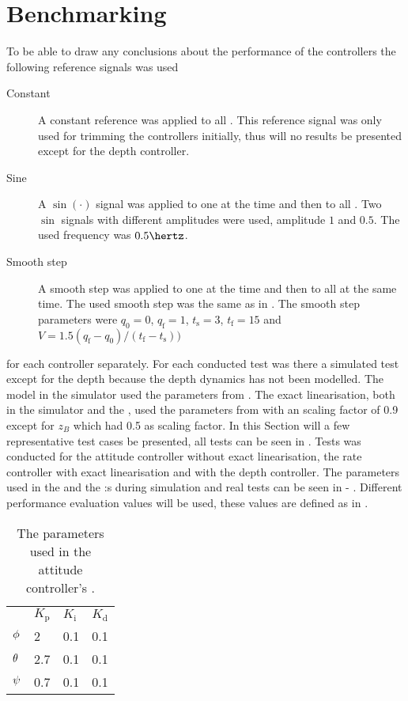 \section{Benchmarking}
To be able to draw any conclusions about the performance of the controllers the following reference signals was used
\begin{description}
\item[Constant] A constant reference was applied to all \abbrDOF. This reference signal was only used for trimming the controllers initially, thus will no results be presented except for the depth controller.

\item[Sine] A $\sin(\cdot)$ signal was applied to one \abbrDOF at the time and then to all \abbrDOF. Two $\sin$ signals with different amplitudes were used, amplitude $1$ and $0.5$. The used frequency was $0.5 \hertz$.

\item[Smooth step] A smooth step was applied to one \abbrDOF at the time and then to all \abbrDOF at the same time. The used smooth step was the same as in \citet[p. 192-195]{robotics}. The smooth step parameters were $q_{\text{0}} = 0$, $q_{\text{f}} = 1$, $t_{\text{s}} = 3$, $t_{\text{f}} = 15$ and $V = 1.5 (q_{\text{f}} - q_{\text{0}})/(t_{\text{f}} - t_{\text{s}}))$
\end{description}
for each controller separately. For each conducted test was there a simulated test except for the depth because the depth dynamics has not been modelled. The \abbrROV model in the simulator used the parameters from . The exact linearisation, both in the simulator and the \abbrROV, used the parameters from  with an scaling factor of 0.9 except for $z_B$ which had 0.5 as scaling factor. In this Section will a few representative test cases be presented, all tests can be seen in . Tests was conducted for the \abbrPID attitude controller without exact linearisation, the \abbrPI rate controller with exact linearisation and with the \abbrPI depth controller. The parameters used in the \abbrPID and the \abbrPI:s during simulation and real tests can be seen in  - . Different performance evaluation values will be used, these values are defined as in \citet{reglerteori}. 

\begin{table}[tbp]
  \centering
  \caption{\label{tab:parametersAttitude}%
    The parameters used in the attitude controller's \abbrPID.}
  \begin{tabular}{l l l l}
    \toprule%
       & \textbf{$K_\text{p}$} & \textbf{$K_\text{i}$}& \textbf{$K_\text{d}$}\\
    \otoprule%
    $\phi$  & 2   & 0.1 & 0.1 \\
    $\theta$ & 2.7 & 0.1 & 0.1 \\
    $\psi$   & 0.7 & 0.1 & 0.1 \\
    \bottomrule%
  \end{tabular}
\end{table}

